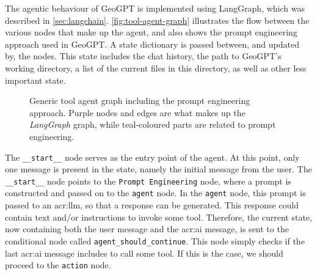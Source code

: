 The agentic behaviour of GeoGPT is implemented using LangGraph, which was described in \autoref{sec:langchain}. \autoref{fig:tool-agent-graph} illustrates the flow between the various nodes that make up the agent, and also shows the prompt engineering approach used in GeoGPT. A state dictionary is passed between, and updated by, the nodes. This state includes the chat history, the path to GeoGPT's working directory, a list of the current files in this directory, as well as other less important state.


\begin{figure}
    \centering
    \caption[Generic tool agent graph including the prompt engineering approach]{Generic tool agent graph including the prompt engineering approach. Purple nodes and edges are what makes up the \textit{LangGraph} graph, while teal-coloured parts are related to prompt engineering.}
    \label{fig:tool-agent-graph}
\end{figure}

The \texttt{\_\_start\_\_} node serves as the entry point of the agent. At this point, only one message is present in the state, namely the initial message from the user. The \texttt{\_\_start\_\_} node points to the \texttt{Prompt Engineering} node, where a prompt is constructed and passed on to the \texttt{agent} node. In the \texttt{agent} node, this prompt is passed to an \acrshort{acr:llm}, so that a response can be generated. This response could contain text and/or instructions to invoke some tool. Therefore, the current state, now containing both the user message and the \acrshort{acr:ai} message, is sent to the conditional node called \texttt{agent\_should\_continue}. This node simply checks if the last \acrshort{acr:ai} message includes to call some tool. If this is the case, we should proceed to the \texttt{action} node.

